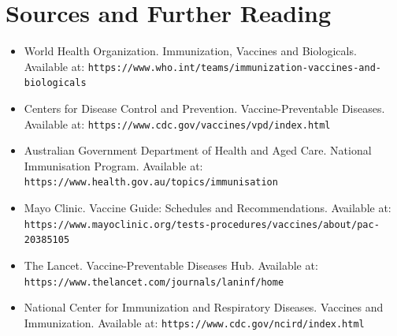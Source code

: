 \section*{Sources and Further Reading}
\begin{itemize}
    \item World Health Organization. Immunization, Vaccines and Biologicals. Available at: \texttt{https://www.who.int/teams/immunization-vaccines-and-biologicals}
    \item Centers for Disease Control and Prevention. Vaccine-Preventable Diseases. Available at: \texttt{https://www.cdc.gov/vaccines/vpd/index.html}
    \item Australian Government Department of Health and Aged Care. National Immunisation Program. Available at: \texttt{https://www.health.gov.au/topics/immunisation}
    \item Mayo Clinic. Vaccine Guide: Schedules and Recommendations. Available at: \texttt{https://www.mayoclinic.org/tests-procedures/vaccines/about/pac-20385105}
    \item The Lancet. Vaccine-Preventable Diseases Hub. Available at: \texttt{https://www.thelancet.com/journals/laninf/home}
    \item National Center for Immunization and Respiratory Diseases. Vaccines and Immunization. Available at: \texttt{https://www.cdc.gov/ncird/index.html}
\end{itemize}
